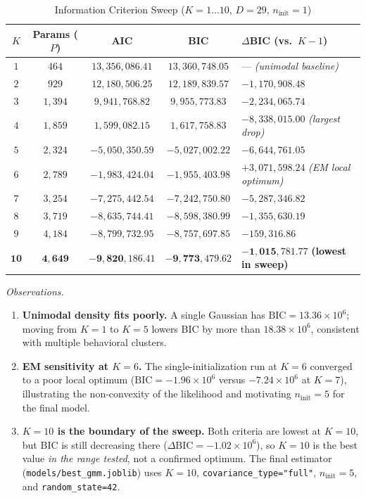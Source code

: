 \documentclass[conference]{IEEEtran}
\begin{document}
\begin{table}[!t]
\centering
\caption{Information Criterion Sweep ($K = 1 \dots 10$, $D = 29$, $n_{\text{init}} = 1$)}
\renewcommand{\arraystretch}{1.15}
\small
\begin{tabular}{ccccl}
\toprule
$K$ & \textbf{Params ($P$)} & \textbf{AIC} & \textbf{BIC} & $\Delta$\textbf{BIC (vs.\ $K-1$)} \\
\midrule
$1$ & $464$ & $13{,}356{,}086.41$ & $13{,}360{,}748.05$ & --- \textit{(unimodal baseline)} \\
$2$ & $929$ & $12{,}180{,}506.25$ & $12{,}189{,}839.57$ & $-1{,}170{,}908.48$ \\
$3$ & $1{,}394$ & $9{,}941{,}768.82$ & $9{,}955{,}773.83$ & $-2{,}234{,}065.74$ \\
$4$ & $1{,}859$ & $1{,}599{,}082.15$ & $1{,}617{,}758.83$ & $-8{,}338{,}015.00$ \textit{(largest drop)} \\
$5$ & $2{,}324$ & $-5{,}050{,}350.59$ & $-5{,}027{,}002.22$ & $-6{,}644{,}761.05$ \\
$6$ & $2{,}789$ & $-1{,}983{,}424.04$ & $-1{,}955{,}403.98$ & $+3{,}071{,}598.24$ \textit{(EM local optimum)} \\
$7$ & $3{,}254$ & $-7{,}275{,}442.54$ & $-7{,}242{,}750.80$ & $-5{,}287{,}346.82$ \\
$8$ & $3{,}719$ & $-8{,}635{,}744.41$ & $-8{,}598{,}380.99$ & $-1{,}355{,}630.19$ \\
$9$ & $4{,}184$ & $-8{,}799{,}732.95$ & $-8{,}757{,}697.85$ & $-159{,}316.86$ \\
$\mathbf{10}$ & $\mathbf{4{,}649}$ & $\mathbf{-9{,}820{,}186.41}$ & $\mathbf{-9{,}773{,}479.62}$ & $\mathbf{-1{,}015{,}781.77}$ \textbf{(lowest in sweep)} \\
\bottomrule
\end{tabular}
\label{tab:aic_bic}
\end{table}

\textit{Observations.}
\begin{enumerate}
    \item \textbf{Unimodal density fits poorly.} A single Gaussian has $\text{BIC} = 13.36\times10^{6}$; moving from $K=1$ to $K=5$ lowers BIC by more than $18.38\times10^{6}$, consistent with multiple behavioral clusters.
    \item \textbf{EM sensitivity at $K=6$.} The single-initialization run at $K=6$ converged to a poor local optimum ($\text{BIC} = -1.96\times10^{6}$ versus $-7.24\times10^{6}$ at $K=7$), illustrating the non-convexity of the likelihood and motivating $n_{\text{init}} = 5$ for the final model.
    \item \textbf{$K=10$ is the boundary of the sweep.} Both criteria are lowest at $K=10$, but BIC is still decreasing there ($\Delta\text{BIC} = -1.02\times10^{6}$), so $K=10$ is the best value \emph{in the range tested}, not a confirmed optimum. The final estimator (\texttt{models/best\_gmm.joblib}) uses $K=10$, \texttt{covariance\_type="full"}, $n_{\text{init}}=5$, and \texttt{random\_state=42}.
\end{enumerate}
\end{document}
